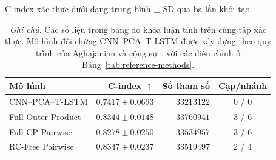\begin{table}[H]
\centering\small
\caption[So sánh C-index và độ phức tạp mô hình]{C-index xác thực dưới dạng trung bình $\pm$ SD qua ba lần khởi tạo.}
\label{tab:standard-bench}
\begin{tabularx}{\linewidth}{@{}Y r r c@{}}
\toprule
\textbf{Mô hình} & \textbf{C-index $\uparrow$} & \textbf{Số tham số} & \textbf{Cặp/nhánh} \\
\midrule
CNN--PCA--T-LSTM & $0.7417\pm0.0693$ & $33213122$ & 0 / 0 \\
Full Outer-Product & $0.8344\pm0.0148$ & $33760941$ & 3 / 6 \\
Full CP Pairwise & $0.8278\pm0.0250$ & $33534957$ & 3 / 6 \\
RC-Free Pairwise & $\mathbf{0.8347\pm0.0237}$ & $33519497$ & 2 / 4 \\
\bottomrule
\end{tabularx}
\caption*{\textit{Ghi chú.} Các số liệu trong bảng do khóa luận tính trên cùng tập xác thực. Mô hình đối chứng CNN--PCA--T-LSTM được xây dựng theo quy trình của Aghajanian và cộng sự~\cite{aghajanian2025longitudinal}, với các điều chỉnh ở Bảng~\ref{tab:reference-methods}.}
\end{table}
